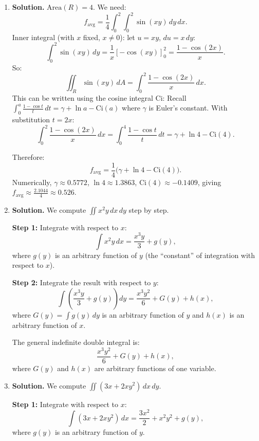 \begin{enumerate}
That is, $g$ is an odd function of $y$. Since the $y$-integration runs over $[-2,2]$, which is symmetric about $0$:
\[
\int_{-2}^{2} g(x,y)\,dy = 0 \quad \text{for each fixed } x \neq 0.
\]

Therefore:
\[
\iint_{[-1,1]\times[-2,2]}\frac{xy}{x^2+y^2}\,dA = \int_{-1}^1\underbrace{\left(\int_{-2}^2\frac{xy}{x^2+y^2}\,dy\right)}_{=\,0}\,dx = \boxed{0}. \qed
\]

\item \textbf{Solution.}
$\text{Area}(R) = 4$. We need:
\[
f_{\text{avg}} = \frac{1}{4}\int_0^2\int_0^2 \sin(xy)\,dy\,dx.
\]
Inner integral (with $x$ fixed, $x \neq 0$): let $u = xy$, $du = x\,dy$:
\[
\int_0^2\sin(xy)\,dy = \frac{1}{x}[-\cos(xy)]_0^2 = \frac{1-\cos(2x)}{x}.
\]
So:
\[
\iint_R\sin(xy)\,dA = \int_0^2\frac{1-\cos(2x)}{x}\,dx.
\]
This can be written using the cosine integral $\text{Ci}$: Recall $\int_0^a\frac{1-\cos t}{t}\,dt = \gamma + \ln a - \text{Ci}(a)$ where $\gamma$ is Euler's constant. With substitution $t=2x$:
\[
\int_0^2\frac{1-\cos(2x)}{x}\,dx = \int_0^4\frac{1-\cos t}{t}\,dt = \gamma + \ln 4 - \text{Ci}(4).
\]

Therefore:
\[
f_{\text{avg}} = \frac{1}{4}\bigl(\gamma + \ln 4 - \text{Ci}(4)\bigr).
\]
Numerically, $\gamma \approx 0.5772$, $\ln 4 \approx 1.3863$, $\text{Ci}(4) \approx -0.1409$, giving $f_{\text{avg}} \approx \frac{2.1044}{4} \approx \boxed{0.526}$.

\item \textbf{Solution.}
We compute $\iint x^2 y\,dx\,dy$ step by step.

\textbf{Step 1:} Integrate with respect to $x$:
\[
\int x^2 y\,dx = \frac{x^3 y}{3} + g(y),
\]
where $g(y)$ is an arbitrary function of $y$ (the ``constant'' of integration with respect to $x$).

\textbf{Step 2:} Integrate the result with respect to $y$:
\[
\int\left(\frac{x^3 y}{3} + g(y)\right)dy = \frac{x^3 y^2}{6} + G(y) + h(x),
\]
where $G(y) = \int g(y)\,dy$ is an arbitrary function of $y$ and $h(x)$ is an arbitrary function of $x$.

The general indefinite double integral is:
\[
\boxed{\frac{x^3 y^2}{6} + G(y) + h(x)},
\]
where $G(y)$ and $h(x)$ are arbitrary functions of one variable.

\item \textbf{Solution.}
We compute $\iint(3x + 2xy^2)\,dx\,dy$.

\textbf{Step 1:} Integrate with respect to $x$:
\[
\int(3x + 2xy^2)\,dx = \frac{3x^2}{2} + x^2 y^2 + g(y),
\]
where $g(y)$ is an arbitrary function of $y$.


\end{enumerate}
